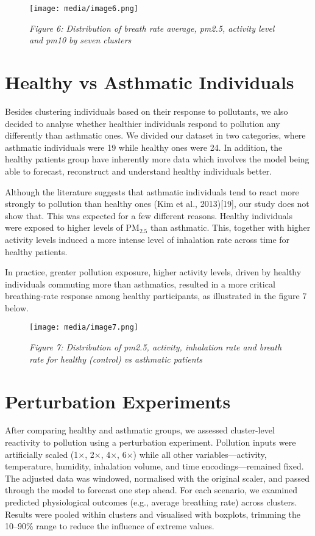 \documentclass[12pt,a4paper]{report}
\begin{document}
\begin{figure}[h!]
    \centering
    \texttt{[image: media/image6.png]}
    \caption*{\emph{Figure 6: Distribution of breath rate average, pm2.5, activity
level and pm10 by seven clusters}}
\end{figure}


\section{Healthy vs Asthmatic Individuals}
Besides clustering individuals based on their response to pollutants, we
also decided to analyse whether healthier individuals respond to
pollution any differently than asthmatic ones. We divided our dataset in
two categories, where asthmatic individuals were 19 while healthy ones
were 24. In addition, the healthy patients group have inherently more
data which involves the model being able to forecast, reconstruct and
understand healthy individuals better.

Although the literature suggests that asthmatic individuals tend to
react more strongly to pollution than healthy ones (Kim et al.,
2013){[}19{]}, our study does not show that. This was expected for a few
different reasons. Healthy individuals were exposed to higher levels of
$\mathrm{PM}_{2.5}$ than asthmatic. This, together with higher activity levels induced
a more intense level of inhalation rate across time for healthy
patients.

In practice, greater pollution exposure, higher activity levels, driven
by healthy individuals commuting more than asthmatics, resulted in a
more critical breathing-rate response among healthy participants, as
illustrated in the figure 7 below.

\begin{figure}[h!]
    \centering
    \texttt{[image: media/image7.png]}
    \caption*{\emph{Figure 7: Distribution of pm2.5, activity, inhalation rate and
breath rate for healthy (control) vs asthmatic patients}}
\end{figure}


\section{Perturbation Experiments}
After comparing healthy and asthmatic groups, we assessed cluster-level
reactivity to pollution using a perturbation experiment. Pollution
inputs were artificially scaled (1×, 2×, 4×, 6×) while all other
variables---activity, temperature, humidity, inhalation volume, and time
encodings---remained fixed. The adjusted data was windowed, normalised
with the original scaler, and passed through the model to forecast one
step ahead. For each scenario, we examined predicted physiological
outcomes (e.g., average breathing rate) across clusters. Results were
pooled within clusters and visualised with boxplots, trimming the
10--90\% range to reduce the influence of extreme values.
\end{document}
